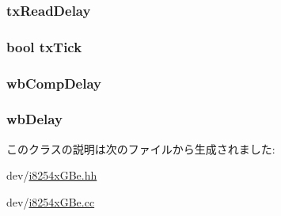 \label{classIGbE_a8d22e1a154942ff0d4ab9048e7e844bb}
\hypertarget{classIGbE_a2e204efac3d8a0a09aef20570520baac}{
\subsubsection[{txReadDelay}]{ {\bf txReadDelay}}}
\label{classIGbE_a2e204efac3d8a0a09aef20570520baac}
\hypertarget{classIGbE_a0f33aec9eb84199e089e1917f7df501d}{
\subsubsection[{txTick}]{\setlength{\rightskip}{0pt plus 5cm}bool {\bf txTick}}}
\label{classIGbE_a0f33aec9eb84199e089e1917f7df501d}
\hypertarget{classIGbE_ab0f05d6ecbedd2a670abfe34bc8112e1}{
\subsubsection[{wbCompDelay}]{ {\bf wbCompDelay}}}
\label{classIGbE_ab0f05d6ecbedd2a670abfe34bc8112e1}
\hypertarget{classIGbE_a899afa4a59ed0cf8334061645dc16c53}{
\subsubsection[{wbDelay}]{ {\bf wbDelay}}}
\label{classIGbE_a899afa4a59ed0cf8334061645dc16c53}


このクラスの説明は次のファイルから生成されました:\begin{DoxyCompactItemize}
\item 
dev/\hyperlink{i8254xGBe_8hh}{i8254xGBe.hh}\item 
dev/\hyperlink{i8254xGBe_8cc}{i8254xGBe.cc}\end{DoxyCompactItemize}
